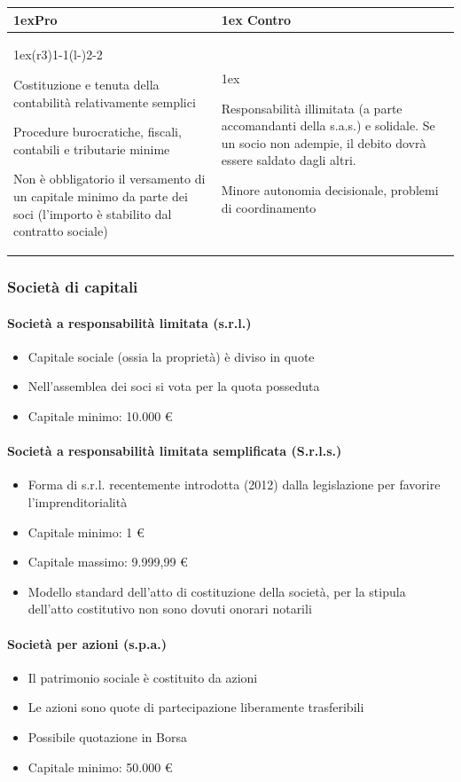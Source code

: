 \documentclass[10pt,a4paper,fleqn,oneside]{book}
\makeatletter
\newcommand{\proandcons}[2]{
    \begin{tabularx}{\linewidth}{>{\parskip1ex}X@{\kern4\tabcolsep}>{\parskip1ex}X}

        \toprule
        \hfil\bfseries Pro
        &
        \hfil\bfseries Contro
        \\\cmidrule(r{3\tabcolsep}){1-1}\cmidrule(l{-\tabcolsep}){2-2}
        
        #1

        &
        #2
        \\\bottomrule
    \end{tabularx}
}
\makeatother
\begin{document}
\proandcons{
    Costituzione e tenuta della contabilità relativamente semplici
    
    Procedure burocratiche, fiscali, contabili e tributarie minime
    
    Non è obbligatorio il versamento di un capitale minimo da parte dei
    soci (l’importo è stabilito dal contratto sociale)
}{
    Responsabilità illimitata (a parte accomandanti della s.a.s.) e solidale.
    Se un socio non adempie, il debito dovrà essere saldato dagli altri.

    Minore autonomia decisionale, problemi di coordinamento 
}

\subsubsection{Società di capitali}

\paragraph{Società a responsabilità limitata (s.r.l.)}
\begin{itemize}
    \item Capitale sociale (ossia la proprietà) è diviso in quote
    \item Nell’assemblea dei soci si vota per la quota posseduta
    \item Capitale minimo: 10.000 \euro
\end{itemize}

\paragraph{Società a responsabilità limitata semplificata (S.r.l.s.)}
\begin{itemize}
    \item Forma di s.r.l. recentemente introdotta (2012) dalla legislazione per
    favorire l’imprenditorialità
    \item Capitale minimo: 1 \euro
    \item Capitale massimo: 9.999,99 \euro
    \item Modello standard dell’atto di costituzione della società, per la stipula
    dell'atto costitutivo non sono dovuti onorari notarili
\end{itemize}

\paragraph{Società per azioni (s.p.a.)}
\begin{itemize}
    \item Il patrimonio sociale è costituito da azioni
    \item Le azioni sono quote di partecipazione liberamente trasferibili
    \item Possibile quotazione in Borsa
    \item Capitale minimo: 50.000 \euro
\end{itemize}
\end{document}
